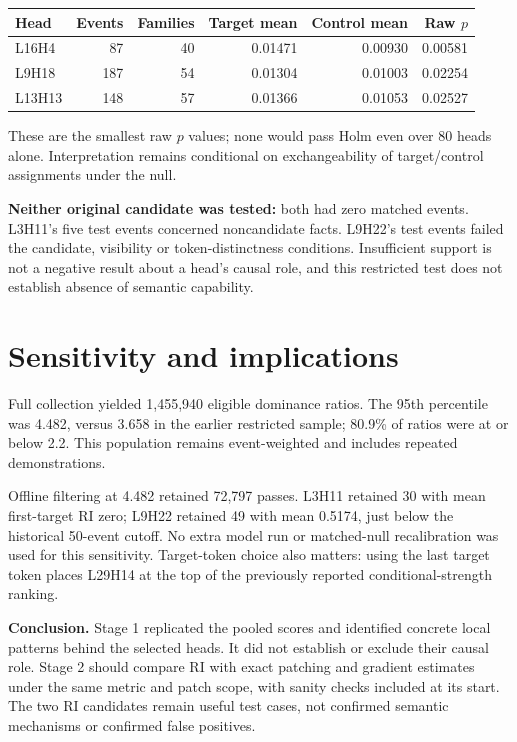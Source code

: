 \documentclass[11pt,a4paper]{article}
\begin{document}
\begin{center}
\small
\begin{tabular}{lrrrrr}
\toprule
Head & Events & Families & Target mean & Control mean & Raw $p$ \\
\midrule
L16H4 & 87 & 40 & 0.01471 & 0.00930 & 0.00581 \\
L9H18 & 187 & 54 & 0.01304 & 0.01003 & 0.02254 \\
L13H13 & 148 & 57 & 0.01366 & 0.01053 & 0.02527 \\
\bottomrule
\end{tabular}
\end{center}
These are the smallest raw $p$ values; none would pass Holm even over 80 heads alone. Interpretation remains conditional on exchangeability of target/control assignments under the null.

\textbf{Neither original candidate was tested:} both had zero matched events. L3H11's five test events concerned noncandidate facts. L9H22's test events failed the candidate, visibility or token-distinctness conditions. Insufficient support is not a negative result about a head's causal role, and this restricted test does not establish absence of semantic capability.

\section{Sensitivity and implications}
Full collection yielded 1,455,940 eligible dominance ratios. The 95th percentile was 4.482, versus 3.658 in the earlier restricted sample; 80.9\% of ratios were at or below 2.2. This population remains event-weighted and includes repeated demonstrations.

Offline filtering at 4.482 retained 72,797 passes. L3H11 retained 30 with mean first-target RI zero; L9H22 retained 49 with mean 0.5174, just below the historical 50-event cutoff. No extra model run or matched-null recalibration was used for this sensitivity. Target-token choice also matters: using the last target token places L29H14 at the top of the previously reported conditional-strength ranking.

\textbf{Conclusion.} Stage 1 replicated the pooled scores and identified concrete local patterns behind the selected heads. It did not establish or exclude their causal role. Stage 2 should compare RI with exact patching and gradient estimates under the same metric and patch scope, with sanity checks included at its start. The two RI candidates remain useful test cases, not confirmed semantic mechanisms or confirmed false positives.
\end{document}
